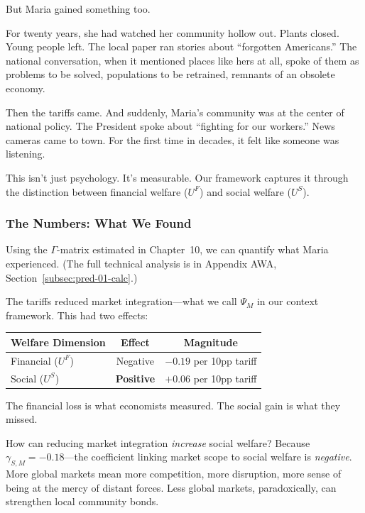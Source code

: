 But Maria gained something too.

For twenty years, she had watched her community hollow out. Plants closed. Young 
people left. The local paper ran stories about ``forgotten Americans.'' The national 
conversation, when it mentioned places like hers at all, spoke of them as problems 
to be solved, populations to be retrained, remnants of an obsolete economy.

Then the tariffs came. And suddenly, Maria's community was at the center of 
national policy. The President spoke about ``fighting for our workers.'' News 
cameras came to town. For the first time in decades, it felt like someone was 
listening.

This isn't just psychology. It's measurable. Our framework captures it through 
the distinction between financial welfare ($U^F$) and social welfare ($U^S$).

\subsubsection{The Numbers: What We Found}

Using the $\Gamma$-matrix estimated in Chapter~10, we can quantify what Maria 
experienced. (The full technical analysis is in Appendix AWA, Section~\ref{subsec:pred-01-calc}.)

The tariffs reduced market integration---what we call $\Psi_M$ in our context 
framework. This had two effects:

\begin{center}
\renewcommand{\arraystretch}{1.3}
\begin{tabular}{lcc}
\hline
\textbf{Welfare Dimension} & \textbf{Effect} & \textbf{Magnitude} \\
\hline
Financial ($U^F$) & Negative & $-0.19$ per 10pp tariff \\
Social ($U^S$) & \textbf{Positive} & $+0.06$ per 10pp tariff \\
\hline
\end{tabular}
\end{center}

The financial loss is what economists measured. The social gain is what they missed.

How can reducing market integration \emph{increase} social welfare? Because 
$\gamma_{S,M} = -0.18$---the coefficient linking market scope to social welfare 
is \emph{negative}. More global markets mean more competition, more disruption, 
more sense of being at the mercy of distant forces. Less global markets, 
paradoxically, can strengthen local community bonds.

